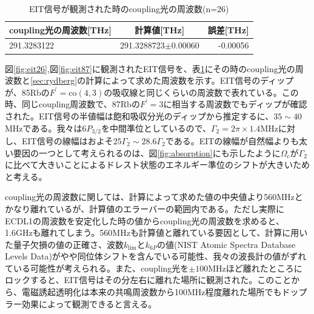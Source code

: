 \documentclass[dvipdfmx]{jsreport}
\begin{document}
\begin{table}[hbtp]
  \caption{EIT信号が観測された時のcoupling光の周波数(n=26)}
  \label{table:eit26}
  \centering
  \begin{tabular}{lcr}
    \hline
    coupling光の周波数[THz] & 計算値[THz] & 誤差[THz]  \\
    \hline
    291.3283122  & 291.3288723$\pm 0.00060$ & -0.00056  \\
    \hline
  \end{tabular}
\end{table}
図\ref{fig:eit26},図\ref{fig:eit87}に観測されたEIT信号を、表\ref{table:eit26}にその時のcoupling光の周波数と\ref{sec:rydberg}の計算によって求めた周波数を示す。EIT信号のディップが、85Rbの$F^{'} = \text{co}(4,3)$の吸収線と同じくらいの周波数で表れている。この時、同じcoupling周波数で、87Rbの$F^{'} = 3$に相当する周波数でもディップが確認された。EIT信号の半値幅は飽和吸収分光のディップから推定するに、$35 \sim 40$MHzである。我々は$6P_{3/2}$を中間準位としているので、$\Gamma_2 = 2\pi \times 1.4$MHzに対し、EIT信号の線幅はおよそ$25\Gamma_2 \sim 28.6\Gamma_2$である。EITの線幅が自然幅よりも太い要因の一つとして考えられるのは、図\ref{fig:absorption}にも示したように$\Omega_c$が$\Gamma_2$に比べて大きいことによるドレスト状態のエネルギー準位のシフトが大きいためと考える。

coupling光の周波数に関しては、計算によって求めた値の中央値より560MHzとかなり離れているが、計算値のエラーバーの範囲内である。ただし実際にECDL1の周波数を安定化した時の値からcoupling光の周波数を求めると、1.6GHzも離れてしまう。560MHzも計算値と離れている要因として、計算に用いた量子欠損の値の正確さ、波数$k_{\text{lim}}$と$k_{6P}$の値\cite{nist}(NIST Atomic Spectra Database Levels Data)がやや同位体シフトを含んでいる可能性、我々の波長計の値がずれている可能性が考えられる。また、coupling光を$\pm 100$MHzほど離れたところにロックすると、EIT信号はその分左右に離れた場所に観測された。このことから、電磁誘起透明化は本来の共鳴周波数から100MHz程度離れた場所でもドップラー効果によって観測できると言える。
\end{document}
